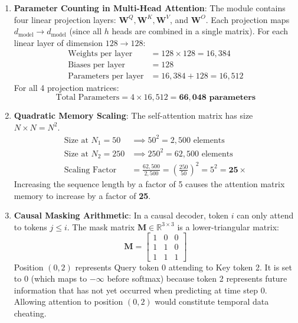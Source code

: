\begin{enumerate}
    \item \textbf{Parameter Counting in Multi-Head Attention}:
    The module contains four linear projection layers: $\mathbf{W}^Q, \mathbf{W}^K, \mathbf{W}^V$, and $\mathbf{W}^O$.
    Each projection maps $d_{\text{model}} \to d_{\text{model}}$ (since all $h$ heads are combined in a single matrix).
    For each linear layer of dimension $128 \to 128$:
    \begin{align*}
    \text{Weights per layer} &= 128 \times 128 = 16{,}384 \\
    \text{Biases per layer} &= 128 \\
    \text{Parameters per layer} &= 16{,}384 + 128 = 16{,}512
    \end{align*}
    For all 4 projection matrices:
    \begin{equation*}
    \text{Total Parameters} = 4 \times 16{,}512 = \mathbf{66{,}048 \text{ parameters}}
    \end{equation*}

    \item \textbf{Quadratic Memory Scaling}:
    The self-attention matrix has size $N \times N = N^2$.
    \begin{align*}
    \text{Size at } N_1 = 50 &\implies 50^2 = 2{,}500 \text{ elements} \\
    \text{Size at } N_2 = 250 &\implies 250^2 = 62{,}500 \text{ elements} \\
    \text{Scaling Factor} &= \frac{62{,}500}{2{,}500} = \left(\frac{250}{50}\right)^2 = 5^2 = \mathbf{25\times}
    \end{align*}
    Increasing the sequence length by a factor of 5 causes the attention matrix memory to increase by a factor of \textbf{25}.

    \item \textbf{Causal Masking Arithmetic}:
    In a causal decoder, token $i$ can only attend to tokens $j \le i$. The mask matrix $\mathbf{M} \in \mathbb{R}^{3 \times 3}$ is a lower-triangular matrix:
    \begin{equation*}
    \mathbf{M} = \begin{bmatrix}
    1 & 0 & 0 \\
    1 & 1 & 0 \\
    1 & 1 & 1
    \end{bmatrix}
    \end{equation*}
    Position $(0, 2)$ represents Query token 0 attending to Key token 2. It is set to $0$ (which maps to $-\infty$ before softmax) because token 2 represents future information that has not yet occurred when predicting at time step 0. Allowing attention to position $(0, 2)$ would constitute temporal data cheating.


\end{enumerate}
